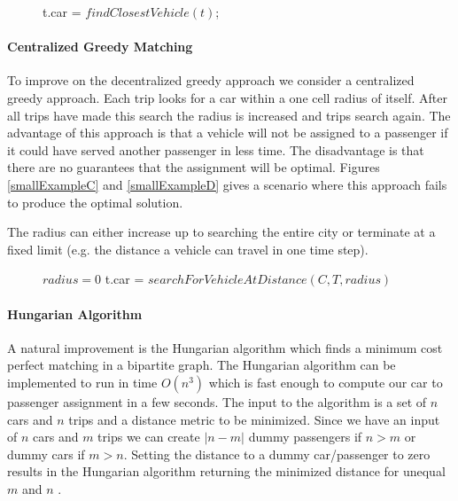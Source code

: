 \documentclass[letterpaper]{article}
\begin{document}
\begin{figure}
\begin{algorithmic}

\State t.car = $findClosestVehicle(t)$;
\EndWhile
\EndFunction
\end{algorithmic}
\end{figure}

\paragraph{Centralized Greedy Matching}
To improve on the decentralized greedy approach we consider a centralized greedy approach. Each trip looks for a car within a one cell radius of itself. After all trips have made this search the radius is increased and trips search again. The advantage of this approach is that a vehicle will not be assigned to a passenger if it could have served another passenger in less time. The disadvantage is that there are no guarantees that the assignment will be optimal. Figures \ref{smallExampleC} and \ref{smallExampleD} gives a scenario where this approach fails to produce the optimal solution.

The radius can either increase up to searching the entire city or terminate at a fixed limit (e.g. the distance a vehicle can travel in one time step).

\begin{figure}
\begin{algorithmic}
\State $radius = 0$
\State t.car = $searchForVehicleAtDistance(C,T,radius)$
\EndFor
\EndFor
\EndFunction
\end{algorithmic}
\end{figure}

\paragraph{Hungarian Algorithm}
A natural improvement is the Hungarian algorithm \cite{kuhn1955hungarian} which finds a minimum cost perfect matching in a bipartite graph. The Hungarian algorithm can be implemented to run in time $O(n^3)$ which is fast enough to compute our car to passenger assignment in a few seconds. The input to the algorithm is a set of $n$ cars and $n$ trips and a distance metric to be minimized. Since we have an input of $n$ cars and $m$ trips we can create $|n-m|$ dummy passengers if $n > m$ or dummy cars if $m > n$. Setting the distance to a dummy car/passenger to zero results in the Hungarian algorithm returning the minimized distance for unequal $m$ and $n$ \cite{macalpine2015scram}.
\end{document}
